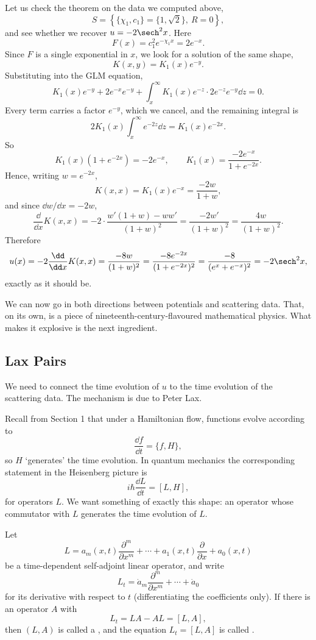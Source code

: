 \begin{example}
	Let us check the theorem on the data we computed above,
	$$
	S = \left\{\{\chi_1, c_1\} = \{1,\sqrt2\},\ R = 0\right\},
	$$
	and see whether we recover $u = -2\sech^2x$. Here
	$$
	F(x) = c_1^2e^{-\chi_1 x} = 2e^{-x}.
	$$
	Since $F$ is a single exponential in $x$, we look for a solution of the same shape,
	$$
	K(x,y) = K_1(x)e^{-y}.
	$$
	Substituting into the GLM equation,
	$$
	K_1(x)e^{-y} + 2e^{-x}e^{-y} + \int_x^\infty K_1(x)e^{-z}\cdot 2e^{-z}e^{-y}\dd z = 0.
	$$
	Every term carries a factor $e^{-y}$, which we cancel, and the remaining integral is
	$$
	2K_1(x)\int_x^\infty e^{-2z}\dd z = K_1(x)e^{-2x}.
	$$
	So
	$$
	K_1(x)\left(1 + e^{-2x}\right) = -2e^{-x}, \qquad K_1(x) = \frac{-2e^{-x}}{1+e^{-2x}}.
	$$
	Hence, writing $w = e^{-2x}$,
	$$
	K(x,x) = K_1(x)e^{-x} = \frac{-2w}{1+w},
	$$
	and since $\dd w/\dd x = -2w$,
	$$
	\frac{\dd}{\dd x}K(x,x) = -2\cdot\frac{w'(1+w) - ww'}{(1+w)^2} = \frac{-2w'}{(1+w)^2} = \frac{4w}{(1+w)^2}.
	$$
	Therefore
	$$
	u(x) = -2\frac{\dd}{\dd x}K(x,x) = \frac{-8w}{(1+w)^2} = \frac{-8e^{-2x}}{(1+e^{-2x})^2} = \frac{-8}{(e^x + e^{-x})^2} = -2\sech^2x,
	$$
	exactly as it should be.
\end{example}

We can now go in both directions between potentials and scattering data. That, on its own, is a piece of nineteenth-century-flavoured mathematical physics. What makes it explosive is the next ingredient.

\subsection{Lax Pairs}

We need to connect the time evolution of $u$ to the time evolution of the scattering data. The mechanism is due to Peter Lax.

Recall from Section 1 that under a Hamiltonian flow, functions evolve according to
$$
\frac{\dd f}{\dd t} = \{f, H\},
$$
so $H$ `generates' the time evolution. In quantum mechanics the corresponding statement in the Heisenberg picture is
$$
i\hbar\frac{\dd L}{\dd t} = [L, H],
$$
for operators $L$. We want something of exactly this shape: an operator whose commutator with $L$ generates the time evolution of $L$.

\begin{definition}
	Let
	$$
	L = a_m(x,t)\frac{\partial^m}{\partial x^m} + \cdots + a_1(x,t)\frac{\partial}{\partial x} + a_0(x,t)
	$$
	be a time-dependent self-adjoint linear operator, and write
	$$
	L_t = \dot a_m\frac{\partial^m}{\partial x^m}+\cdots+\dot a_0
	$$
	for its derivative with respect to $t$ (differentiating the coefficients only). If there is an operator $A$ with
	$$
	L_t = LA - AL = [L, A],
	$$
	then $(L,A)$ is called a , and the equation $L_t = [L,A]$ is called .
\end{definition}

